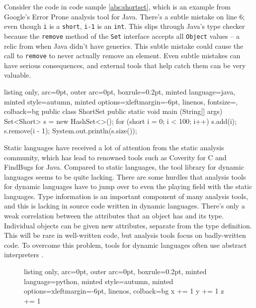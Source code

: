 \documentclass[a4paper, 11pt]{article}
\newenvironment{Figure}
  {\par\noindent\minipage{\linewidth}}
  {\endminipage\par}
\begin{document}
\begin{multicols*}{2}
Consider the code in code sample \ref{abs:shortset}, which is an example from Google's Error Prone analysis tool for Java. There's a subtle mistake on line 6; even though \texttt{i} is a \texttt{short}, \texttt{i-1} is an \texttt{int}. This slips through Java's type checker because the \texttt{remove} method of the \texttt{Set} interface accepts all \texttt{Object} values -- a relic from when Java didn't have generics. This subtle mistake could cause the call to \texttt{remove} to never actually remove an element. Even subtle mistakes can have serious consequences, and external tools that help catch them can be very valuable. 

\begin{Figure}
\begin{tcblisting}{listing only, 
  arc=0pt,
  outer arc=0pt, 
  boxrule=0.2pt,
  minted language=java,
  minted style=autumn,
  minted options={xleftmargin=-6pt, linenos, fontsize=\footnotesize},
  colback=bg }
public class ShortSet {
  public static void main (String[] args) {
    Set<Short> s = new HashSet<>();
    for (short i = 0; i < 100; i++) {
      s.add(i);
      s.remove(i - 1);
    }
    System.out.println(s.size());
  }
}
\end{tcblisting}
\label{abs:shortset}
\end{Figure}


Static languages have received a lot of attention from the static analysis community, which has lead to renowned tools such as Coverity for C and FindBugs for Java. Compared to static languages, the tool library for dynamic languages seems to be quite lacking. There are some hurdles that analysis tools for dynamic languages have to jump over to even the playing field with the static languages. Type information is an important component of many analysis tools, and this is lacking in source code written in dynamic languages. There's only a weak correlation between the attributes that an object has and its type. Individual objects can be given new attributes, separate from the type definition. This will be rare in well-written code, but analysis tools focus on badly-written code. To overcome this problem, tools for dynamic languages often use abstract interpreters \cite{jsure, interpret}. 

\begin{figure*}[t]
\centering
 \begin{minipage}{0.31\textwidth}
  \begin{tcblisting}{listing only, 
  arc=0pt,
  outer arc=0pt, 
  boxrule=0.2pt,
  minted language=python,
  minted style=autumn,
  minted options={xleftmargin=-6pt, linenos},
  colback=bg }
x += 1
y += 1
z += 1


\end{tcblisting}
\end{minipage}
\end{figure*}
\end{multicols*}
\end{document}
